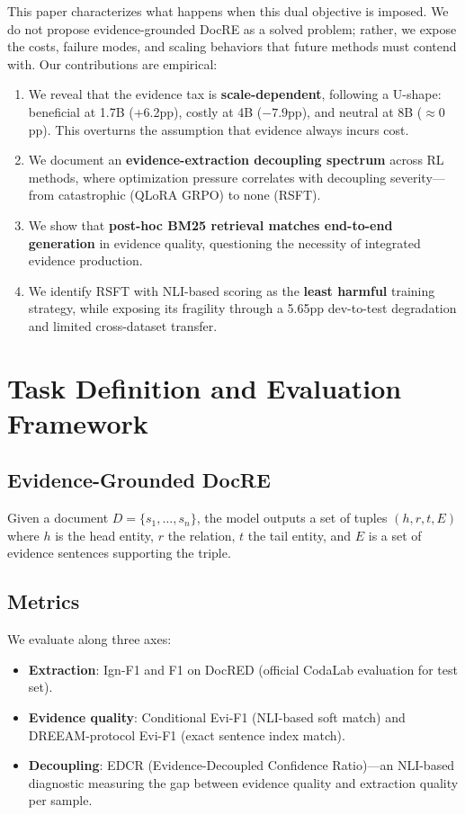 \documentclass[11pt]{article}
\begin{document}
This paper characterizes what happens when this dual objective is imposed. We do not propose evidence-grounded DocRE as a solved problem; rather, we expose the costs, failure modes, and scaling behaviors that future methods must contend with. Our contributions are empirical:

\begin{enumerate}
\item We reveal that the evidence tax is \textbf{scale-dependent}, following a U-shape: beneficial at 1.7B (+6.2pp), costly at 4B ($-7.9$pp), and neutral at 8B ($\approx 0$pp). This overturns the assumption that evidence always incurs cost.
\item We document an \textbf{evidence-extraction decoupling spectrum} across RL methods, where optimization pressure correlates with decoupling severity---from catastrophic (QLoRA GRPO) to none (RSFT).
\item We show that \textbf{post-hoc BM25 retrieval matches end-to-end generation} in evidence quality, questioning the necessity of integrated evidence production.
\item We identify RSFT with NLI-based scoring as the \textbf{least harmful} training strategy, while exposing its fragility through a 5.65pp dev-to-test degradation and limited cross-dataset transfer.
\end{enumerate}

\section{Task Definition and Evaluation Framework}

\subsection{Evidence-Grounded DocRE}

Given a document $D = \{s_1, \ldots, s_n\}$, the model outputs a set of tuples $(h, r, t, E)$ where $h$ is the head entity, $r$ the relation, $t$ the tail entity, and $E$ is a set of evidence sentences supporting the triple.

\subsection{Metrics}

We evaluate along three axes:
\begin{itemize}
\item \textbf{Extraction}: Ign-F1 and F1 on DocRED (official CodaLab evaluation for test set).
\item \textbf{Evidence quality}: Conditional Evi-F1 (NLI-based soft match) and DREEAM-protocol Evi-F1 (exact sentence index match).
\item \textbf{Decoupling}: EDCR (Evidence-Decoupled Confidence Ratio)---an NLI-based diagnostic measuring the gap between evidence quality and extraction quality per sample.
\end{itemize}
\end{document}
